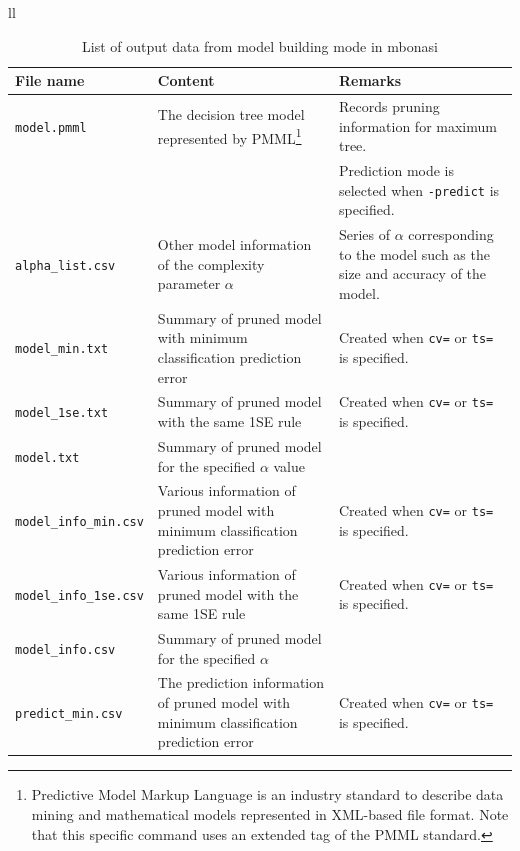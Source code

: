 \begin{table}[!htbp]
\begin{center}
\begin{tabular}{ll}

\begin{minipage}{1.0\hsize}
\begin{center}
\caption{List of output data from model building mode in mbonasi\label{tbl:mbonsai_out}}
{\small
\begin{tabular}{ | l p{7cm} | p{7cm} |}
\hline
File name&Content&Remarks\\
\hline
\verb|model.pmml|       & The decision tree model represented by PMML\footnote{
Predictive Model Markup Language is an industry standard to describe data mining and mathematical models represented in XML-based file format. Note that this specific command uses an extended tag of the PMML standard.
}                                                 & Records pruning information for maximum tree. \\
                          &                                          & Prediction mode is selected when \verb|-predict| is specified.  \\
\verb|alpha_list.csv|     & Other model information of the complexity parameter $\alpha$    & Series of $\alpha$ corresponding to the model such as the size and accuracy of the model.  \\
\verb|model_min.txt|      & Summary of pruned model with  minimum classification prediction error     & Created when  \verb|cv=| or  \verb|ts=| is specified. \\
\verb|model_1se.txt|      & Summary of pruned model with the same 1SE rule      & Created when  \verb|cv=| or  \verb|ts=| is specified. \\
\verb|model.txt|          & Summary of pruned model for the specified $\alpha$ value    & \\
\verb|model_info_min.csv| & Various information of pruned model with  minimum classification prediction error  & Created when  \verb|cv=| or  \verb|ts=| is specified.  \\
\verb|model_info_1se.csv| & Various information of pruned model with the same 1SE rule  & Created when  \verb|cv=| or  \verb|ts=| is specified.  \\
\verb|model_info.csv|     & Summary of pruned model for the specified $\alpha$    & \\
\verb|predict_min.csv|    & The prediction information of pruned model with  minimum classification prediction error  & Created when  \verb|cv=| or  \verb|ts=| is specified.   \\

\end{tabular}}
\end{center}
\end{minipage}
\end{tabular}
\end{center}
\end{table}
